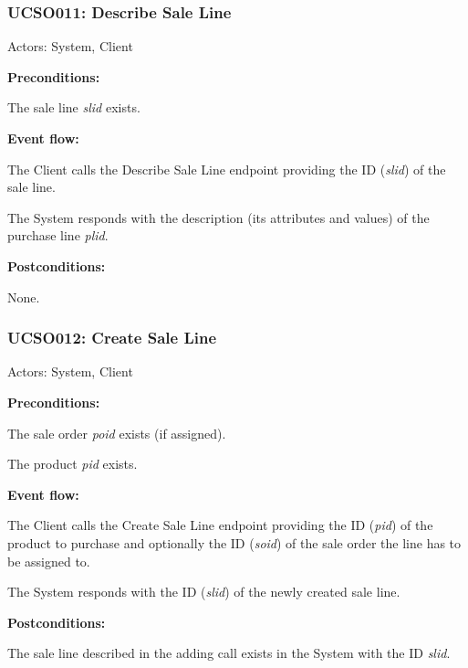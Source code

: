 \begin{ucbox}{\subsubsection{UCSO011: Describe Sale Line}}
\label{UCSO011}

Actors: System, Client

\textbf{Preconditions:}

\ucitem The sale line \textit{slid} exists.

\textbf{Event flow:}

\ucitem The Client calls the Describe Sale Line endpoint providing the ID (\textit{slid}) of the sale line.

\ucitem The System responds with the description (its attributes and values) of the purchase line \textit{plid}.

\textbf{Postconditions:}

\ucitem None.

\end{ucbox}

\begin{ucbox}{\subsubsection{UCSO012: Create Sale Line}}
\label{UCSO012}

Actors: System, Client

\textbf{Preconditions:}

\ucitem The sale order \textit{poid} exists (if assigned).

\ucitem The product \textit{pid} exists.

\textbf{Event flow:}

\ucitem The Client calls the Create Sale Line endpoint providing the ID (\textit{pid}) of the product to purchase and optionally the ID (\textit{soid}) of the sale order the line has to be 
assigned to.

\ucitem The System responds with the ID (\textit{slid}) of the newly created sale line.

\textbf{Postconditions:}

\ucitem The sale line described in the adding call exists in the System with the ID \textit{slid}.

\end{ucbox}

